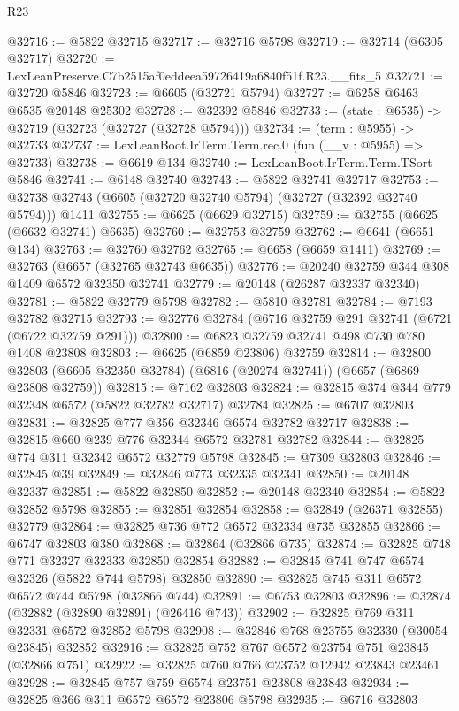 \begin{lexlean}{R23}
\begin{coremodule}
@32716 := @5822 @32715
@32717 := @32716 @5798
@32719 := @32714 (@6305 @32717)
@32720 := LexLeanPreserve.C7b2515af0eddeea59726419a6840f51f.R23.__fits_5
@32721 := @32720 @5846
@32723 := @6605 (@32721 @5794)
@32727 := @6258 @6463 @6535 @20148 @25302
@32728 := @32392 @5846
@32733 := (state : @6535) -> @32719 (@32723 (@32727 (@32728 @5794)))
@32734 := (term : @5955) -> @32733
@32737 := LexLeanBoot.IrTerm.Term.rec.{0} (fun (__v : @5955) => @32733)
@32738 := @6619 @134
@32740 := LexLeanBoot.IrTerm.Term.TSort @5846
@32741 := @6148 @32740
@32743 := @5822 @32741 @32717
@32753 := @32738 @32743 (@6605 (@32720 @32740 @5794) (@32727 (@32392 @32740 @5794))) @1411
@32755 := @6625 (@6629 @32715)
@32759 := @32755 (@6625 (@6632 @32741) @6635)
@32760 := @32753 @32759
@32762 := @6641 (@6651 @134)
@32763 := @32760 @32762
@32765 := @6658 (@6659 @1411)
@32769 := @32763 (@6657 (@32765 @32743 @6635))
@32776 := @20240 @32759 @344 @308 @1409 @6572 @32350 @32741
@32779 := @20148 (@26287 @32337 @32340)
@32781 := @5822 @32779 @5798
@32782 := @5810 @32781
@32784 := @7193 @32782 @32715
@32793 := @32776 @32784 (@6716 @32759 @291 @32741 (@6721 (@6722 @32759 @291)))
@32800 := @6823 @32759 @32741 @498 @730 @780 @1408 @23808
@32803 := @6625 (@6859 @23806) @32759
@32814 := @32800 @32803 (@6605 @32350 @32784) (@6816 (@20274 @32741)) (@6657 (@6869 @23808 @32759))
@32815 := @7162 @32803
@32824 := @32815 @374 @344 @779 @32348 @6572 (@5822 @32782 @32717) @32784
@32825 := @6707 @32803
@32831 := @32825 @777 @356 @32346 @6574 @32782 @32717
@32838 := @32815 @660 @239 @776 @32344 @6572 @32781 @32782
@32844 := @32825 @774 @311 @32342 @6572 @32779 @5798
@32845 := @7309 @32803
@32846 := @32845 @39
@32849 := @32846 @773 @32335 @32341
@32850 := @20148 @32337
@32851 := @5822 @32850
@32852 := @20148 @32340
@32854 := @5822 @32852 @5798
@32855 := @32851 @32854
@32858 := @32849 (@26371 @32855) @32779
@32864 := @32825 @736 @772 @6572 @32334 @735 @32855
@32866 := @6747 @32803 @380
@32868 := @32864 (@32866 @735)
@32874 := @32825 @748 @771 @32327 @32333 @32850 @32854
@32882 := @32845 @741 @747 @6574 @32326 (@5822 @744 @5798) @32850
@32890 := @32825 @745 @311 @6572 @6572 @744 @5798 (@32866 @744)
@32891 := @6753 @32803
@32896 := @32874 (@32882 (@32890 @32891) (@26416 @743))
@32902 := @32825 @769 @311 @32331 @6572 @32852 @5798
@32908 := @32846 @768 @23755 @32330 (@30054 @23845) @32852
@32916 := @32825 @752 @767 @6572 @23754 @751 @23845 (@32866 @751)
@32922 := @32825 @760 @766 @23752 @12942 @23843 @23461
@32928 := @32845 @757 @759 @6574 @23751 @23808 @23843
@32934 := @32825 @366 @311 @6572 @6572 @23806 @5798
@32935 := @6716 @32803

\end{coremodule}
\end{lexlean}
